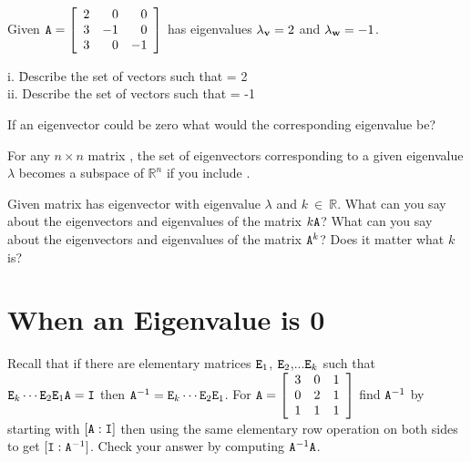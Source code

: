 \begin{myexc}[\bd{c}]
	Given $\texttt{A} = \left[ \begin{array}{rrr} 2 & 0 & 0 \\ 3 & -1 & 0 \\ 3 & 0 & -1 \end{array} \right]$ has eigenvalues $\lambda_{\mathbf{v}} = 2$ and $\lambda_{\mathbf{w}} = -1$. 
	\begin{tabbing}
		\indent   i. \space  \= Describe the set of vectors  such that  = 2 \\
		\indent  ii. \> Describe the set of vectors  such that  = -1  \\
	\end{tabbing}
\end{myexc}

\noindent {} If an eigenvector could be zero what would the corresponding eigenvalue be?

\vspace{.5cm}

\begin{theorem}
	For any  $n \times n$ matrix , the set of eigenvectors corresponding to a given eigenvalue $\lambda$ becomes a subspace of $\mathbb{R}^n$ if you include  . 
\end{theorem}

\noindent {} Given matrix  has eigenvector  with eigenvalue $\lambda$ and $k~\in~\mathbb{R}$. What can you say about the eigenvectors and eigenvalues of the matrix $k\texttt{A}$? What can you say about the eigenvectors and eigenvalues of the matrix $\texttt{A}^k$?  Does it matter what $k$ is?   

\vspace{.5cm}

\section{When an Eigenvalue is 0}    \label{When an Eigenvalue is 0}

\begin{myexa}[\bd{a}]
	Recall that if there are elementary matrices  $\texttt{E}_1$, $\texttt{E}_2$,...$\texttt{E}_k$  such that $\texttt{E}_k\cdots\texttt{E}_2\texttt{E}_1\texttt{A} = \texttt{I} $ then  $\texttt{A}^{-1}= \texttt{E}_k\cdots\texttt{E}_2\texttt{E}_1$. For  $\texttt{A} = \left[ \begin{array}{rrr}  3 & 0 & 1 \\ 0 & 2 & 1 \\ 1 & 1 & 1 \end{array} \right]$ find $\texttt{A}^{-1}$ by starting with $[\texttt{A}:\texttt{I}]$ then using the same elementary row operation on both sides to get $[\texttt{I}:\texttt{A}^{-1}]$.  Check your answer by computing $\texttt{A}^{-1}\texttt{A}$. 
\end{myexa} 

